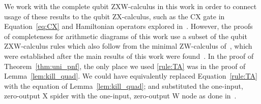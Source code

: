\begin{remark}
  We work with the complete qubit ZXW-calculus in this work in order to connect usage of these results to the qubit ZX-calculus, such as the CX gate in Equation~\eqref{eq:CX} and Hamiltonian operators explored in~\cite{shaikh2022sum}.
  However, the proofs of completeness for arithmetic diagrams of this work use a subset of the qubit ZXW-calculus rules which also follow from the minimal ZW-calculus of~\cite{deVisme2025minzw}, which were established after the main results of this work were found~\cite{Agnew2023Masters}.
  In the proof of Theorem~\ref{thm:uni_pnf}, the only place we used \eqref{rule:TA} was in the proof of Lemma~\ref{lem:kill_quad}. We could have equivalently replaced Equation~\eqref{rule:TA} with the equation of Lemma~\ref{lem:kill_quad}; and substituted the one-input, zero-output X spider with the one-input, zero-output W node as done in~\cite{deVisme2025minzw}.
\end{remark}